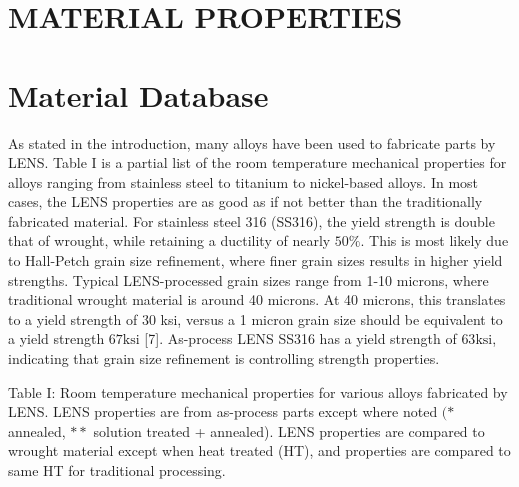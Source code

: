\documentclass[10pt]{article}
\begin{document}
\section*{MATERIAL PROPERTIES}
\section*{Material Database}
As stated in the introduction, many alloys have been used to fabricate parts by LENS. Table I is a partial list of the room temperature mechanical properties for alloys ranging from stainless steel to titanium to nickel-based alloys. In most cases, the LENS properties are as good as if not better than the traditionally fabricated material. For stainless steel 316 (SS316), the yield strength is double that of wrought, while retaining a ductility of nearly $50 \%$. This is most likely due to Hall-Petch grain size refinement, where finer grain sizes results in higher yield strengths. Typical LENS-processed grain sizes range from 1-10 microns, where traditional wrought material is around 40 microns. At 40 microns, this translates to a yield strength of 30 ksi, versus a 1 micron grain size should be equivalent to a yield strength $67 \mathrm{ksi}$ [7]. As-process LENS SS316 has a yield strength of $63 \mathrm{ksi}$, indicating that grain size refinement is controlling strength properties.

Table I: Room temperature mechanical properties for various alloys fabricated by LENS. LENS properties are from as-process parts except where noted $(*$ annealed, $* *$ solution treated + annealed). LENS properties are compared to wrought material except when heat treated (HT), and properties are compared to same HT for traditional processing.
\end{document}
